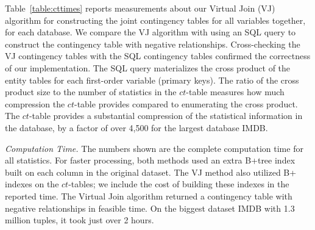 \documentclass{acm_proc_article-sp}
\newcommand{\ct}{\mathit{ct}}
\begin{document}
Table~\ref{table:cttimes} reports measurements about our Virtual Join (VJ) algorithm for constructing the joint contingency tables for all variables together, for each database. 
We compare the VJ algorithm with using an SQL query to construct the contingency table with negative relationships. Cross-checking the VJ contingency tables with the SQL contingency tables confirmed the correctness of our implementation. The SQL query materializes the cross product of the entity tables for each first-order variable (primary keys).  
The ratio of the cross product size to the number of statistics in the $\ct$-table measures how much compression the $\ct$-table provides compared to enumerating the cross product. The $\ct$-table provides a substantial compression of the statistical information in the database, by a factor of over 4,500 for the largest database IMDB. 

{\em Computation Time.} The numbers shown are the complete computation time for all statistics. For faster processing, both methods used an extra B+tree index built on each column in the original dataset. The VJ method also utilized B+ indexes on the $\ct$-tables; we include the cost of building these indexes in the reported time. 
%
%
The Virtual Join algorithm returned a contingency table with negative relationships in feasible time. On the biggest dataset IMDB with 1.3 million tuples, it took just over 2 hours. 
\end{document}

